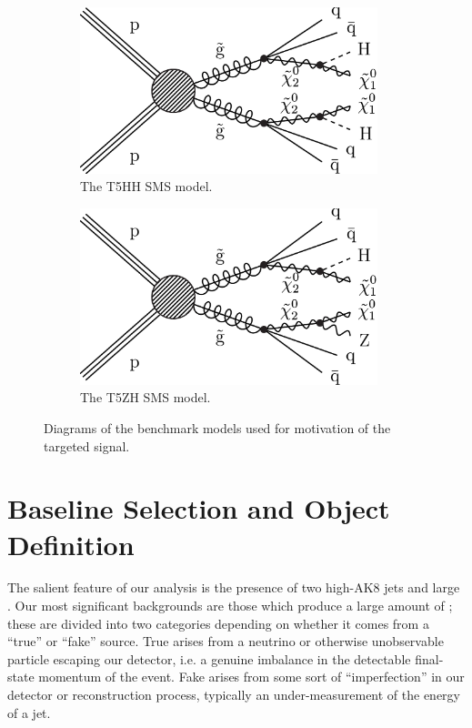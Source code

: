 \begin{figure}
\centering
\begin{subfigure}[b]{0.425\textwidth}
\includegraphics[width=0.95\textwidth]{figs/CMS-SUS-17-006_Figure_001.pdf}
\caption{The T5HH SMS model.}
\label{fig:t5hh}
\end{subfigure}
\begin{subfigure}[b]{0.425\textwidth}
\includegraphics[width=0.95\textwidth]{figs/CMS-SUS-17-006_Figure-aux_001.pdf}
\caption{The T5ZH SMS model.}
\label{fig:t5zh}
\end{subfigure}
\caption{Diagrams of the benchmark models used for motivation of the targeted signal.}
\label{fig:sms}
\end{figure}

\section{Baseline Selection and Object Definition}
\label{sec:baseline}

The salient feature of our analysis is the presence of two high-\pt AK8 jets and large \ptmiss. Our most significant backgrounds are those which produce a large amount of \ptmiss; these are divided into two categories depending on whether it comes from a ``true'' or ``fake'' source. True \ptmiss arises from a neutrino or otherwise unobservable particle escaping our detector, i.e. a genuine imbalance in the detectable final-state momentum of the event. Fake \ptmiss arises from some sort of ``imperfection'' in our detector or reconstruction process, typically an under-measurement of the energy of a jet.

